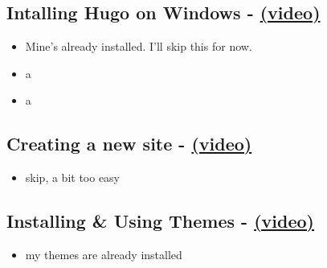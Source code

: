 \subsection{Intalling Hugo on Windows - \href{https://youtu.be/G7umPCU-8xc?list=PLLAZ4kZ9dFpOnyRlyS-liKL5ReHDcj4G3}{(video)} }
\begin{itemize}
	\item Mine's already installed. I'll skip this for now.
	\item a
	\item a
\end{itemize}

\subsection{Creating a new site - \href{https://youtu.be/sB0HLHjgQ7E?list=PLLAZ4kZ9dFpOnyRlyS-liKL5ReHDcj4G3}{(video)} }
\begin{itemize}
	\item skip, a bit too easy
\end{itemize}

\subsection{Installing \& Using Themes - \href{https://youtu.be/L34JL_3Jkyc?list=PLLAZ4kZ9dFpOnyRlyS-liKL5ReHDcj4G3}{(video)} }
\begin{itemize}
	\item my themes are already installed
\end{itemize}

